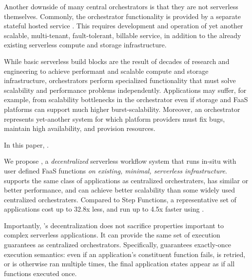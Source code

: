 Another downside of many central orchestrators is that they are not serverless themselves.
Commonly, the orchestrator functionality is provided by a separate stateful hosted service
\cite{aws-step-functions, google-cloud-composer, google-workflows}. This requires
development and operation of yet another scalable, multi-tenant, fault-tolerant, 
billable service, in addition to the already existing serverless compute and storage 
infrastructure. 

While basic
serverless build blocks are the result of decades of research and engineering to
achieve performant and scalable compute and storage infrastructure,
orchestrators perform specialized functionality that must solve
scalability and performance problems independently. Applications may suffer, for
example, from scalability bottlenecks in the orchestrator even if storage and
FaaS platforms can support much higher burst-scalability. Moreover, an
orchestrator represents yet-another system for which platform providers must fix
bugs, maintain high availability, and provision resources.

In this paper, .

We propose \name{}, a \textit{decentralized} serverless workflow system
that runs in-situ with user defined FaaS functions \textit{on existing, minimal,
serverless infrastructure}. \name{} supports the same class of applications as
centralized orchestraters, has similar or better performance, and can achieve
better scalability than some widely used centralized orchestraters. Compared to
Step Functions, a representative set of applications cost up to 32.8x less, and
run up to 4.5x faster using \name{}.

Importantly, \name{}'s decentralization does not sacrifice properties important
to complex serverless applications. It can provide the same set of execution
guarantees as centralized orchestrators. Specifically, \name{} guarantees
exactly-once execution semantics: even if an application's constituent function
fails,  is retried, or is otherwise ran multiple times, the final application
states appear as if all functions executed once.

